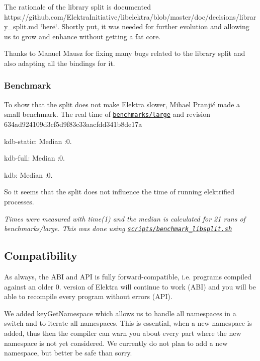The rationale of the library split is documented https\+://github.com/\+Elektra\+Initiative/libelektra/blob/master/doc/decisions/library\+\_\+split.\+md \char`\"{}here\char`\"{}. Shortly put, it was needed for further evolution and allowing us to grow and enhance without getting a fat core.

Thanks to Manuel Mausz for fixing many bugs related to the library split and also adapting all the bindings for it.

\subsubsection*{Benchmark}

To show that the split does not make Elektra slower, Mihael Pranjić made a small benchmark. The real time of \href{https://github.com/ElektraInitiative/libelektra/blob/master/benchmarks/large.c}{\tt benchmarks/large} and revision 634ad924109d3cf5d9f83c33aacfdd341b8de17a


\begin{DoxyEnumerate}
\item kdb-\/static\+: Median \+:0.
\item kdb-\/full\+: Median \+:0.
\item kdb\+: Median \+:0.
\end{DoxyEnumerate}

So it seems that the split does not influence the time of running elektrified processes.

{\itshape Times were measured with time(1) and the median is calculated for 21 runs of benchmarks/large. This was done using \href{https://github.com/ElektraInitiative/libelektra/blob/master/scripts/benchmark_libsplit.sh}{\tt scripts/benchmark\+\_\+libsplit.\+sh}}

\subsection*{Compatibility}

As always, the A\+B\+I and A\+P\+I is fully forward-\/compatible, i.\+e. programs compiled against an older 0. version of Elektra will continue to work (A\+B\+I) and you will be able to recompile every program without errors (A\+P\+I).

We added {\ttfamily key\+Get\+Namespace} which allows us to handle all namespaces in a switch and to iterate all namespaces. This is essential, when a new namespace is added, thus then the compiler can warn you about every part where the new namespace is not yet considered. We currently do not plan to add a new namespace, but better be safe than sorry.

